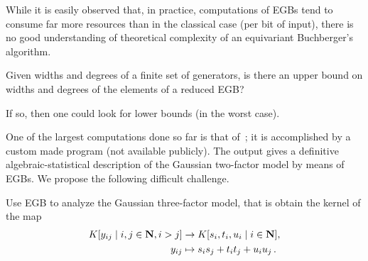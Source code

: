 
While it is easily observed that, in practice, computations of EGBs tend to consume far more resources than in the classical case (per bit of input), there is no good understanding of theoretical complexity of an equivariant Buchberger's algorithm.

\begin{question}
Given widths and degrees of a finite set of generators, is there an upper bound on widths and degrees of the elements of a reduced EGB?

If so, then one could look for lower bounds (in the worst case). 
\end{question}






One of the largest computations done so far is that of~\cite{Brouwer09e}; it is accomplished by a custom made program (not available publicly). The output gives a definitive algebraic-statistical description of the Gaussian two-factor model by means of EGBs.  We propose the following difficult challenge.

\begin{problem}
Use EGB to analyze the Gaussian three-factor model, that is obtain the kernel of the map
\begin{align*} 
K[y_{ij} \mid i,j \in \mathbf N, i > j] &\to K[s_i,t_i,u_i \mid i \in \mathbf N],\\ 
y_{ij} &\mapsto s_is_j + t_it_j + u_iu_j\,.
\end{align*}
\end{problem} 

